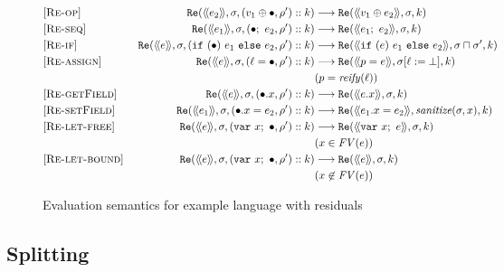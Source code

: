 \begin{figure*}
  \begin{center}
\begin{align*}
  \omit [\textsc{Re-op}] &&
    \c{Re}(\residual{e_2}, \sigma, (v_1 \oplus \bullet,\rho')::k)
    & \longrightarrow
    \c{Re}(\residual{v_1 \oplus e_2}, \sigma, k)
\\
  \omit [\textsc{Re-seq}] &&
    \c{Re}(\residual{e_1}, \sigma, \then{e_2}{\rho'}::k)
    & \longrightarrow
    \c{Re}(\residual{e_1;~e_2}, \sigma, k)
\\
  \omit [\textsc{Re-if}] &&
    \c{Re}(\residual{e}, \sigma, \branch{e_1}{e_2}{\rho'}::k)
    & \longrightarrow
    \c{Re}(\residual{\c{if}~(e)~e_1~\c{else}~e_2}, \sigma \sqcap \sigma', k)
\\
  \omit [\textsc{Re-assign}] &&
    \c{Re}(\residual{e},\sigma, (\ell = \bullet, \rho')::k)
    & \longrightarrow
    \c{Re}(\residual{p = e}, \sigma[\ell := \bot], k)
        \\ &&& (p = \mathit{reify}(\ell))
\\
  \omit [\textsc{Re-getField}] &&
    \c{Re}(\residual{e},\sigma, (\bullet.x, \rho')::k)
    & \longrightarrow
    \c{Re}(\residual{e.x}, \sigma, k)
\\
  \omit [\textsc{Re-setField}] &&
    \c{Re}(\residual{e_1},\sigma, (\bullet.x = e_2, \rho')::k)
    & \longrightarrow
    \c{Re}(\residual{e_1.x = e_2}, \mathit{sanitize}(\sigma, x), k)
\\
  \omit [\textsc{Re-let-free}] &&
    \c{Re}(\residual{e},\sigma, (\c{var}~x;~\bullet, \rho')::k)
    & \longrightarrow
    \c{Re}(\residual{\c{var}~x;~e}, \sigma, k) 
        \\ &&& (x \in \mathit{FV}(e))
\\
  \omit [\textsc{Re-let-bound}] &&
    \c{Re}(\residual{e}, \sigma, (\c{var}~x;~\bullet, \rho')::k)
    & \longrightarrow
    \c{Re}(\residual{e}, \sigma, k) 
        \\ &&& (x \not\in \mathit{FV}(e))
\\
\end{align*}
  \end{center}

\caption{Evaluation semantics for example language with residuals}
\label{fig:imp-cesk-res}
\end{figure*}
    
\subsection{Splitting}

